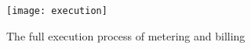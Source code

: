 \begin{figure}[htb]
    \centering
    \texttt{[image: execution]}
    \caption{The full execution process of metering and billing}
    \label{fig:execution}
\end{figure}